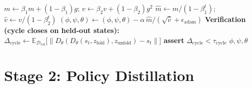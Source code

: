 \documentclass[11pt]{article}
\begin{document}
\begin{algorithm}[H]
\begin{algorithmic}[1]
    \State $m \gets \beta_1 m + (1-\beta_1) g$; \quad $v \gets \beta_2 v + (1-\beta_2) g^2$
    \State $\hat{m} \gets m / (1-\beta_1^{t})$; \quad $\hat{v} \gets v / (1-\beta_2^{t})$
    \State $(\phi,\psi,\theta) \gets (\phi,\psi,\theta) - \alpha\, \hat{m} / (\sqrt{\hat{v}} + \epsilon_{\text{adam}})$
\EndWhile
\State \textbf{Verification (cycle closes on held-out states):}
\State \hspace{1em} $\Delta_{\text{cycle}} \gets \mathbb{E}_{\mathcal{D}_{\text{val}}}\big[\lVert D_\theta(D_\theta(s_t, z_{\text{fold}}), z_{\text{unfold}}) - s_t \rVert\big]$
\State \hspace{1em} \textbf{assert} $\Delta_{\text{cycle}} < \tau_{\text{cycle}}$
\State \Return $\phi, \psi, \theta$
\end{algorithmic}
\end{algorithm}

\section{Stage 2: Policy Distillation}
\label{sec:stage2}
\end{document}
